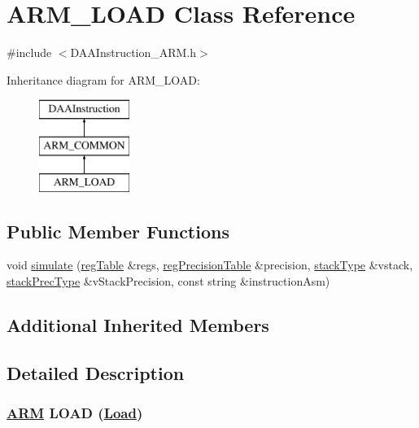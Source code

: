\hypertarget{classARM__LOAD}{}\section{A\+R\+M\+\_\+\+L\+O\+AD Class Reference}
\label{classARM__LOAD}


{\ttfamily \#include $<$D\+A\+A\+Instruction\+\_\+\+A\+R\+M.\+h$>$}

Inheritance diagram for A\+R\+M\+\_\+\+L\+O\+AD\+:\begin{figure}[H]
\begin{center}
\leavevmode
\includegraphics[height=3.000000cm]{classARM__LOAD}
\end{center}
\end{figure}
\subsection*{Public Member Functions}
\begin{DoxyCompactItemize}
\item 
void \hyperlink{classARM__LOAD_a905a6e8a6154825f9dc739cabfdb148d}{simulate} (\hyperlink{DAAInstruction_8h_af0fae93a861de9cf37988d5673cac523}{reg\+Table} \&regs, \hyperlink{DAAInstruction_8h_a0e8cae02815a5f8adc750122d790b455}{reg\+Precision\+Table} \&precision, \hyperlink{DAAInstruction_8h_a1b0e70ac1a04f06c8132055ed01f589f}{stack\+Type} \&vstack, \hyperlink{DAAInstruction_8h_ac5cb793e9dac3fa9693da78b7e29ab30}{stack\+Prec\+Type} \&v\+Stack\+Precision, const string \&instruction\+Asm)
\end{DoxyCompactItemize}
\subsection*{Additional Inherited Members}


\subsection{Detailed Description}


 \subsubsection*{\hyperlink{classARM}{A\+RM} L\+O\+AD (\hyperlink{classLoad}{Load}) }

